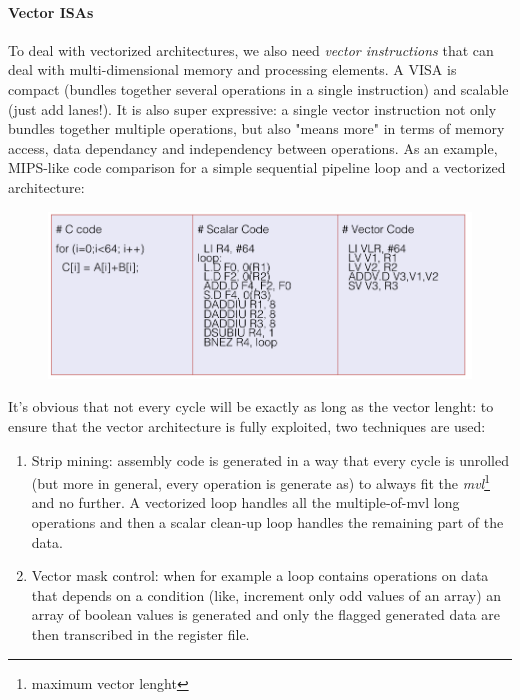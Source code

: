 \documentclass[10pt,a4paper]{article}
\begin{document}
				\paragraph{Vector ISAs}
					To deal with vectorized architectures, we also need \emph{vector instructions} that can deal with multi-dimensional memory and processing elements. A VISA is compact (bundles together several operations in a single instruction) and scalable (just add lanes!). It is also super expressive: a single vector instruction not only bundles together multiple operations, but also "means more" in terms of memory access, data dependancy and independency between operations. As an example, MIPS-like code comparison for a simple sequential pipeline loop and a vectorized architecture:
					\begin{figure}[H]
						\centering
						\includegraphics[width = \textwidth]{./images/vISAs.png}
					\end{figure}
					It's obvious that not every cycle will be exactly as long as the vector lenght: to ensure that the vector architecture is fully exploited, two techniques are used:
					\begin{enumerate}
						\item Strip mining: assembly code is generated in a way that every cycle is unrolled (but more in general, every operation is generate as) to always fit the \emph{mvl}\footnote{maximum vector lenght} and no further. A vectorized loop handles all the multiple-of-mvl long operations and then a scalar clean-up loop handles the remaining part of the data. 
						\item Vector mask control: when for example a loop contains operations on data that depends on a condition (like, increment only odd values of an array) an array of boolean values is generated and only the flagged generated data are then transcribed in the register file. 
					\end{enumerate}
					
\end{document}
